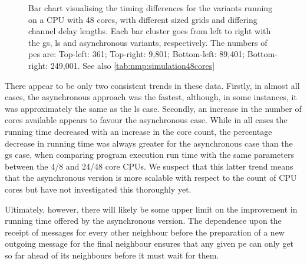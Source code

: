 \begin{figure}
    \caption[Bar chart visualising the timing differences for the variants on a 48-core CPU]{Bar chart visualising the timing differences for the variants running on a CPU with 48 cores, with different sized grids and differing channel delay lengths.  Each bar cluster goes from left to right with the \gls{gs}, \gls{ls} and asynchronous variants, respectively.  The numbers of \glspl{pe} are:  Top-left: 361;  Top-right:  9,801;  Bottom-left:  89,401;  Bottom-right:  249,001.  See also \cref{tab:nmp:simulation48cores}}
    \label{fig:nmp:timings48cores}
\end{figure}

There appear to be only two consistent trends in these data.  Firstly, in almost all cases, the asynchronous approach was the fastest, although, in some instances, it was approximately the same as the \gls{ls} case.  Secondly, an increase in the number of cores available appears to favour the asynchronous case.  While in all cases the running time decreased with an increase in the core count, the percentage decrease in running time was always greater for the asynchronous case than the \gls{gs} case, when comparing program execution run time with the same parameters between the 4/8 and 24/48 core CPUs.  We suspect that this latter trend means that the asynchronous version is more scalable with respect to the count of CPU cores but have not investigated this thoroughly yet.

Ultimately, however, there will likely be some upper limit on the improvement in running time offered by the asynchronous version.  The dependence upon the receipt of messages for every other neighbour before the preparation of a new outgoing message for the final neighbour ensures that any given \gls{pe} can only get so far ahead of its neighbours before it must wait for them.

